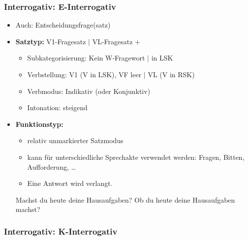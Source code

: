 \begin{frame}
\frametitle{Interrogativ: E-Interrogativ}

\begin{itemize}
	\item Auch: Entscheidungsfrage(satz)
	\item \textbf{Satztyp:} V1-Fragesatz $|$ VL-Fragesatz $+$ 
	\begin{itemize}
		\item Subkategorisierung: Kein W-Fragewort $|$  in LSK
		\item Verbstellung: V1 (V in LSK), VF leer $|$  VL (V in RSK)
		\item Verbmodus: Indikativ (oder Konjunktiv)
		\item Intonation: steigend
	\end{itemize}
	\item \textbf{Funktionstyp:}
	\begin{itemize}
		\item relativ unmarkierter Satzmodus
		\item kann für unterschiedliche Sprechakte verwendet werden: Fragen, Bitten, Aufforderung, \dots
		\item Eine Antwort wird verlangt.
	\end{itemize}
	
	\eal
	\ex Machst du heute deine Hausaufgaben?
	\ex Ob du heute deine Hausaufgaben machst?
	\zl
	
\end{itemize}

\end{frame}


\subsubsection{Interrogativ: K-Interrogativ}


